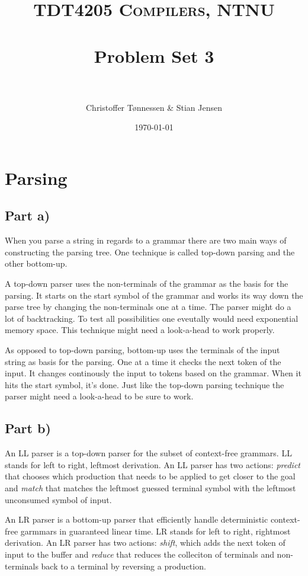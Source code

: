 \documentclass[paper=a4, fontsize=11pt]{scrartcl} %
\title{ 
\normalfont \normalsize 
\textsc{TDT4205 Compilers, NTNU} \\ [25pt] %
\horrule{0.5pt} \\[0.4cm] %
\huge Problem Set 3 \\ %
\horrule{2pt} \\[0.5cm] %
}
\author{Christoffer Tønnessen \& Stian Jensen} %
\date{\normalsize\today} %
\numberwithin{equation}{section} %
\numberwithin{figure}{section} %
\numberwithin{table}{section} %
\begin{document}
\maketitle %

\section{Parsing}
\subsection{Part a)}
When you parse a string in regards to a grammar there are two main ways of constructing the parsing tree. One technique is called top-down parsing and the other bottom-up.

A top-down parser uses the non-terminals of the grammar as the basis for the parsing. It starts on the start symbol of the grammar and works its way down the parse tree by changing the non-terminals one at a time. The parser might do a lot of backtracking. To test all possibilities one eveutally would need exponential memory space. This technique might need a look-a-head to work properly.

As opposed to top-down parsing, bottom-up uses the terminals of the input string as basis for the parsing. One at a time it checks the next token of the input. It changes continously the input to tokens based on the grammar. When it hits the start symbol, it's done. Just like the top-down parsing technique the parser might need a look-a-head to be sure to work.
\subsection{Part b)}
An LL parser is a top-down parser for the subset of context-free grammars. LL stands for left to right, leftmost derivation. An LL parser has two actions: \textit{predict} that chooses which production that needs to be applied to get closer to the goal and \textit{match} that matches the leftmost guessed terminal symbol with the leftmost unconsumed symbol of input.

An LR parser is a bottom-up parser that efficiently handle deterministic context-free garmmars in guaranteed linear time. LR stands for left to right, rightmost derivation. An LR parser has two actions: \textit{shift}, which adds the next token of input to the buffer and \textit{reduce} that reduces the colleciton of terminals and non-terminals back to a terminal by reversing a production.
\end{document}
